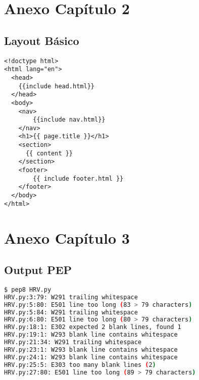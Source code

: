
\appendix
\chapter{Anexo Capítulo 2}

\section{Layout Básico}
\begin{lstlisting}[style=htmlcssjs,caption=Layout Básico]
<!doctype html>
<html lang="en">
  <head>
    {{include head.html}}
  </head>
  <body>
    <nav>
        {{include nav.html}}
    </nav>
    <h1>{{ page.title }}</h1>
    <section>
      {{ content }}
    </section>
    <footer>
        {{ include footer.html }}
    </footer>
  </body>
</html>
\end{lstlisting}

\chapter{Anexo Capítulo 3}

\section{Output PEP}

\begin{lstlisting}[language=sh, caption=Ejemplo de PEP8 con \emph{PyCardio},label={code:pep8}]
$ pep8 HRV.py
HRV.py:3:79: W291 trailing whitespace
HRV.py:5:80: E501 line too long (83 > 79 characters)
HRV.py:5:84: W291 trailing whitespace
HRV.py:6:80: E501 line too long (80 > 79 characters)
HRV.py:18:1: E302 expected 2 blank lines, found 1
HRV.py:19:1: W293 blank line contains whitespace
HRV.py:21:34: W291 trailing whitespace
HRV.py:23:1: W293 blank line contains whitespace
HRV.py:24:1: W293 blank line contains whitespace
HRV.py:25:5: E303 too many blank lines (2)
HRV.py:27:80: E501 line too long (89 > 79 characters)
\end{lstlisting}